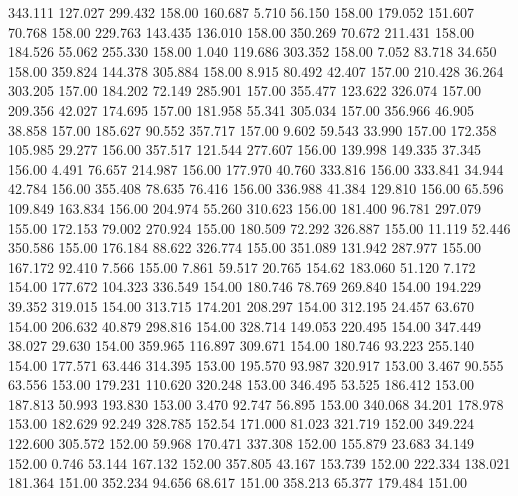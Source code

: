  343.111  127.027  299.432       158.00
 160.687    5.710   56.150       158.00
 179.052  151.607   70.768       158.00
 229.763  143.435  136.010       158.00
 350.269   70.672  211.431       158.00
 184.526   55.062  255.330       158.00
   1.040  119.686  303.352       158.00
   7.052   83.718   34.650       158.00
 359.824  144.378  305.884       158.00
   8.915   80.492   42.407       157.00
 210.428   36.264  303.205       157.00
 184.202   72.149  285.901       157.00
 355.477  123.622  326.074       157.00
 209.356   42.027  174.695       157.00
 181.958   55.341  305.034       157.00
 356.966   46.905   38.858       157.00
 185.627   90.552  357.717       157.00
   9.602   59.543   33.990       157.00
 172.358  105.985   29.277       156.00
 357.517  121.544  277.607       156.00
 139.998  149.335   37.345       156.00
   4.491   76.657  214.987       156.00
 177.970   40.760  333.816       156.00
 333.841   34.944   42.784       156.00
 355.408   78.635   76.416       156.00
 336.988   41.384  129.810       156.00
  65.596  109.849  163.834       156.00
 204.974   55.260  310.623       156.00
 181.400   96.781  297.079       155.00
 172.153   79.002  270.924       155.00
 180.509   72.292  326.887       155.00
  11.119   52.446  350.586       155.00
 176.184   88.622  326.774       155.00
 351.089  131.942  287.977       155.00
 167.172   92.410    7.566       155.00
   7.861   59.517   20.765       154.62
 183.060   51.120    7.172       154.00
 177.672  104.323  336.549       154.00
 180.746   78.769  269.840       154.00
 194.229   39.352  319.015       154.00
 313.715  174.201  208.297       154.00
 312.195   24.457   63.670       154.00
 206.632   40.879  298.816       154.00
 328.714  149.053  220.495       154.00
 347.449   38.027   29.630       154.00
 359.965  116.897  309.671       154.00
 180.746   93.223  255.140       154.00
 177.571   63.446  314.395       153.00
 195.570   93.987  320.917       153.00
   3.467   90.555   63.556       153.00
 179.231  110.620  320.248       153.00
 346.495   53.525  186.412       153.00
 187.813   50.993  193.830       153.00
   3.470   92.747   56.895       153.00
 340.068   34.201  178.978       153.00
 182.629   92.249  328.785       152.54
 171.000   81.023  321.719       152.00
 349.224  122.600  305.572       152.00
  59.968  170.471  337.308       152.00
 155.879   23.683   34.149       152.00
   0.746   53.144  167.132       152.00
 357.805   43.167  153.739       152.00
 222.334  138.021  181.364       151.00
 352.234   94.656   68.617       151.00
 358.213   65.377  179.484       151.00
